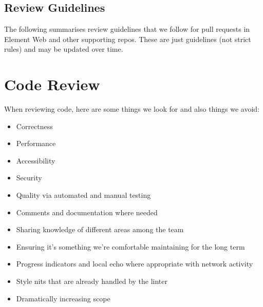 \documentclass[letterpaper,10pt,openany,oneside,english]{sphinxmanual}
\begin{document}
\section{Review Guidelines}
\label{\detokenize{review:review-guidelines}}
\sphinxAtStartPar
The following summarises review guidelines that we follow for pull requests in
Element Web and other supporting repos. These are just guidelines (not strict
rules) and may be updated over time.


\chapter{Code Review}
\label{\detokenize{review:code-review}}
\sphinxAtStartPar
When reviewing code, here are some things we look for and also things we avoid:
\begin{itemize}
\item {} 
\sphinxAtStartPar
Correctness

\item {} 
\sphinxAtStartPar
Performance

\item {} 
\sphinxAtStartPar
Accessibility

\item {} 
\sphinxAtStartPar
Security

\item {} 
\sphinxAtStartPar
Quality via automated and manual testing

\item {} 
\sphinxAtStartPar
Comments and documentation where needed

\item {} 
\sphinxAtStartPar
Sharing knowledge of different areas among the team

\item {} 
\sphinxAtStartPar
Ensuring it’s something we’re comfortable maintaining for the long term

\item {} 
\sphinxAtStartPar
Progress indicators and local echo where appropriate with network activity

\end{itemize}
\begin{itemize}
\item {} 
\sphinxAtStartPar
Style nits that are already handled by the linter

\item {} 
\sphinxAtStartPar
Dramatically increasing scope

\end{itemize}
\end{document}
